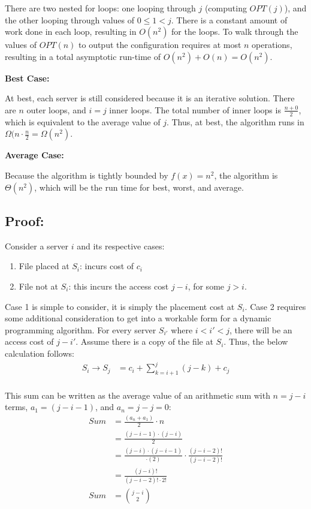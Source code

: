 \documentclass{article}
\begin{document}
There are two nested for loops:  one looping through $j$ (computing $OPT(j)$), and the other looping through values of $0 \leq 1 < j$.  There is a constant amount of work done in each loop, resulting in $O(n^2)$ for the loops.  To walk through the values of $OPT(n)$ to output the configuration requires at most $n$ operations, resulting in a total asymptotic run-time of $O(n^2) + O(n) = O(n^2)$.

\noindent \textbf{Best Case:}

At best, each server is still considered because it is an iterative solution.  There are $n$ outer loops, and $i = j$ inner loops.  The total number of inner loops is $\frac{n + 0}{2}$, which is equivalent to the average value of $j$.
Thus, at best, the algorithm runs in $\Omega(n \cdot \frac{n}{2} = \Omega(n^2)$.

\noindent \textbf{Average Case:}

Because the algorithm is tightly bounded by $f(x) = n^2$, the algorithm is $\Theta(n^2)$, which will be the run time for best, worst, and average.

\subsection*{Proof:}
Consider a server $i$ and its respective cases:
\begin{enumerate}
	\item File placed at $S_i$: incurs cost of $c_i$
	\item File not at $S_i$:  this incurs the access cost $j - i$, for some $j > i$.
\end{enumerate}
Case 1 is simple to consider, it is simply the placement cost at $S_i$. \newline
Case 2 requires some additional consideration to get into a workable form for a dynamic programming algorithm.  For every server $S_{i'}$ where $i < i' < j$, there will be an access cost of $j - i'$.  Assume there is a copy of the file at $S_{i}$.  Thus, the below calculation follows:
\begin{align*}
S_{i} \rightarrow S_j &= c_{i} + \sum_{k=i+1}^{j} (j - k) + c_j \\
\end{align*}

This sum can be written as the average value of an arithmetic sum with $n = j-i$ terms, $a_1 = (j - i - 1)$, and $a_n = j - j = 0$:
\begin{align*}
Sum &= \frac{(a_n + a_1)}{2} \cdot n \\
	&= \frac{(j - i - 1) \cdot (j - i)}{2} \\
	&= \frac{(j-i) \cdot (j - i - 1)}{ \cdot (2)} \cdot \frac{(j - i - 2)!}{(j-i-2)!}  \\
	&= \frac{(j-i)!}{(j-i-2)! \cdot 2!} \\
Sum	&= \binom{j-i}{2}
\end{align*}
\end{document}
